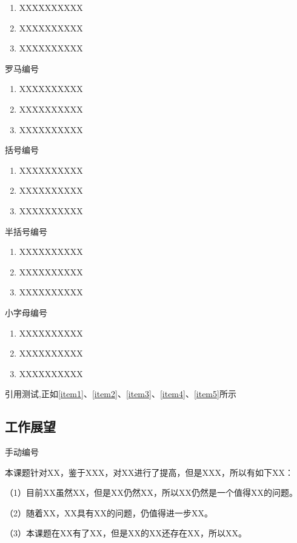\begin{enumerate}[itemindent=2em]
 \item XXXXXXXXXX
 \label{item1}
 \item XXXXXXXXXX
 \item XXXXXXXXXX
\end{enumerate}
罗马编号
\begin{enumerate}[label=(\roman*),itemindent=2em]
 \item XXXXXXXXXX
 \label{item2}
 \item XXXXXXXXXX
 \item XXXXXXXXXX
\end{enumerate}
括号编号
\begin{enumerate}[label=(\arabic*),itemindent=2em]
 \item XXXXXXXXXX
 \label{item3}
 \item XXXXXXXXXX
 \item XXXXXXXXXX
\end{enumerate}
半括号编号
\begin{enumerate}[label=\arabic*),itemindent=2em]
 \item XXXXXXXXXX
 \label{item4}
 \item XXXXXXXXXX
 \item XXXXXXXXXX
\end{enumerate}
小字母编号
\begin{enumerate}[label=\alph*),itemindent=2em]
 \item XXXXXXXXXX
 \label{item5}
 \item XXXXXXXXXX
 \item XXXXXXXXXX
\end{enumerate}

引用测试,正如\ref{item1}、\ref{item2}、\ref{item3}、\ref{item4}、\ref{item5}所示

\subsection{工作展望}
手动编号 %
\par
本课题针对XX，鉴于XXX，对XX进行了提高，但是XXX，所以有如下XX：

（1）目前XX虽然XX，但是XX仍然XX，所以XX仍然是一个值得XX的问题。

（2）随着XX，XX具有XX的问题，仍值得进一步XX。

（3）本课题在XX有了XX，但是XX的XX还存在XX，所以XX。


\newpage
